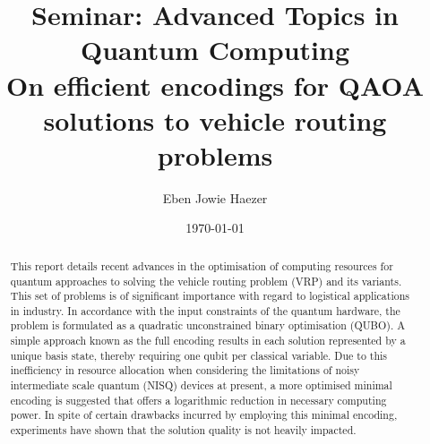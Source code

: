 \documentclass [10pt]{article}
\title {
	Seminar: Advanced Topics in \\
	Quantum Computing \\
	On efficient encodings for QAOA \\
	solutions to vehicle routing problems
}
\author {Eben Jowie Haezer}
\date {\today}
\begin{document}
\maketitle

\begin {abstract}
This report details recent advances in the optimisation of computing resources
for quantum approaches to solving the vehicle routing problem (VRP) and 
its variants. This set of problems is of significant importance with regard
to logistical applications in industry. In accordance with the input
constraints of the quantum hardware, the problem is formulated as a quadratic
unconstrained binary optimisation (QUBO). A simple approach known as the
full encoding results in each solution represented by a unique basis state,
thereby requiring one qubit per classical variable. Due to this inefficiency
in resource allocation when considering the limitations of noisy intermediate
scale quantum (NISQ) devices at present,
a more optimised minimal encoding is suggested that offers a logarithmic
reduction in necessary computing power. In spite of certain drawbacks incurred
by employing this minimal encoding, experiments have shown that the solution
quality is not heavily impacted.
\end {abstract}
\end{document}
